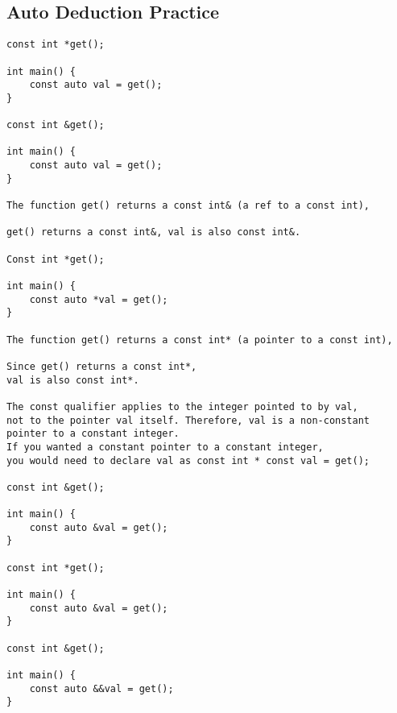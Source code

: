 \documentclass[openany]{report}
\begin{document}
\subsection{Auto Deduction Practice}

\begin{verbatim}
const int *get();

int main() {
    const auto val = get();
}

const int &get();

int main() {
    const auto val = get();
}

The function get() returns a const int& (a ref to a const int),

get() returns a const int&, val is also const int&.

Const int *get();

int main() {
    const auto *val = get();
}

The function get() returns a const int* (a pointer to a const int),

Since get() returns a const int*,
val is also const int*.

The const qualifier applies to the integer pointed to by val,
not to the pointer val itself. Therefore, val is a non-constant pointer to a constant integer.
If you wanted a constant pointer to a constant integer,
you would need to declare val as const int * const val = get();

const int &get();

int main() {
    const auto &val = get();
}

const int *get();

int main() {
    const auto &val = get();
}

const int &get();

int main() {
    const auto &&val = get();
}
\end{verbatim}
\end{document}
